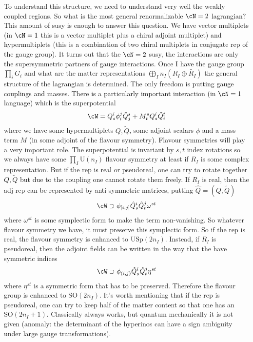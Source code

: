 \documentclass[11pt]{article}
\theoremstyle{definition}
\numberwithin{equation}{section}
\newcommand*\U{\mathrm{U}}
\newcommand*\SO{\mathrm{SO}}
\newcommand*\USp{\mathrm{USp}}
\begin{document}
To understand this structure, we need to understand very well the weakly coupled regions. So what is the most general renormalizable $\cN=2$ lagrangian?  This amount of susy is enough to answer this question. We have vector multiplets (in $\cN=1$ this is a vector multiplet plus a chiral adjoint multiplet) and hypermultiplets (this is a combination of two chiral multiplets in conjugate rep of the gauge group). It turns out that the $\cN=2$ susy, the interactions are only the supersymmetric partners of gauge interactions. Once I have the gauge group $\prod_{i}G_{i}$ and what are the matter representations $\bigoplus_{I}n_{I}(R_{I}\oplus \bar R_{I})$ the general structure of the lagrangian is determined. The only freedom is putting gauge couplings and masses. There is a particularly important interaction (in $\cN=1$ language) which is the superpotential 
\begin{equation}
	\cW=Q_{s}^{i}\phi_{i}^{j}\tilde Q_{{j}}^{s}+M_{t}^{s}Q_{s}^{i}\tilde Q_{i}^{t}
\end{equation}
where we have some hypermultiplets $Q,\tilde Q$, some adjoint scalars $\phi$ and a mass term $M$ (in some adjoint of the flavour symmetry). Flavour symmetries will play a very important role. The superpotential is invariant by $s,t$ index rotations so we always have some $\prod_{I}\U(n_{I})$ flavour symmetry at least if $R_{I}$ is some complex representation. But if the rep is real or pseudoreal, one can try to rotate together $Q,\tilde Q$ but due to the coupling one cannot rotate them freely. If $R_{I}$ is real, then the adj rep can be represented by anti-symmetric matrices, putting $\hat{Q}=(Q,\tilde Q)$
\begin{equation}
	\cW\supset \phi_{\comm{i}{j}}\hat{Q}^{i}_{s}\hat{Q}^{j}_{t}\omega^{st}
\end{equation}
where $\omega^{st}$ is some symplectic form to make the term non-vanishing. So whatever flavour symmetry we have, it must preserve this symplectic form. So if the rep is real, the flavour symmetry is enhanced to $\USp(2n_{I})$. Instead, if $R_{I}$ is pseudoreal, then the adjoint fields can be written in the way that the have symmetric indices 
\begin{equation}
	\cW\supset \phi_{(i,j)}\hat{Q}^{i}_{s}\hat{Q}^{j}_{t}\eta^{st}
\end{equation}
where $\eta^{st}$ is a symmetric form that has to be preserved. Therefore the flavour group is enhanced to $\SO(2n_{I})$. It's worth mentioning that if the rep is pseudoreal, one can try to keep half of the matter content so that one has an $\SO(2n_{I}+1)$. Classically always works, but quantum mechanically it is not given (anomaly: the determinant of the hyperinos can have a sign ambiguity under large gauge transformations).
\end{document}
